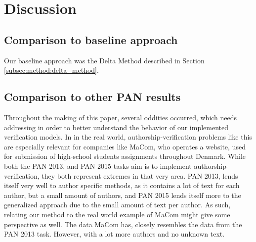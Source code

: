 \section{Discussion} \label{sec:discussion}

\subsection{Comparison to baseline approach}
Our baseline approach was the Delta Method described in Section
\ref{subsec:method:delta_method}.

\subsection{Comparison to other PAN results}

Throughout the making of this paper, several oddities occurred, which needs
addressing in order to better understand the behavior of our implemented
verification models. In in the real world, authorship-verification problems
like this are especially relevant for companies like MaCom, who operates a
website, used for submission of high-school students assignments throughout
Denmark. While both the PAN 2013, and PAN 2015 tasks aim is to implement
authorship-verification, they both represent extremes in that very area. PAN
2013, lends itself very well to author specific methods, as it contains a lot of
text for each author, but a small amount of authors, and PAN 2015 lends itself
more to the generalized approach due to the small amount of text per author. As
such, relating our method to the real world example of MaCom might give some
perspective as well. The data MaCom has, closely resembles the data from the PAN
2013 task. However, with a lot more authors and no unknown text.

